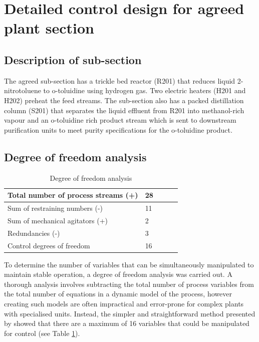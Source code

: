\section{Detailed control design for agreed plant section}
\label{sec:subsec}

\subsection{Description of sub-section}
The agreed sub-section has a trickle bed reactor (R201) that reduces liquid 2-nitrotoluene to o-toluidine using hydrogen gas. Two electric heaters (H201 and H202) preheat the feed streams. The sub-section also has a packed distillation column (S201) that separates the liquid effluent from R201 into methanol-rich vapour and an o-toluidine rich product stream which is sent to downstream purification units to meet purity specifications for the o-toluidine product.

\subsection{Degree of freedom analysis}

\begin{table}
\centering
    \caption{Degree of freedom analysis}
    \label{tab:dof}
\begin{tabular}{@{}lllll@{}}
\toprule
Total number of process streams (+) & 28 &  &  &  \\ \midrule
Sum of restraining numbers (-)      & 11 &  &  &  \\
Sum of mechanical agitators (+)     & 2  &  &  &  \\
Redundancies (-)                    & 3  &  &  &  \\
Control degrees of freedom          & 16 &  &  &  \\ \bottomrule
\end{tabular}
\end{table}

To determine the number of variables that can be simultaneously manipulated to maintain stable operation, a degree of freedom analysis was carried out. A thorough analysis involves subtracting the total number of process variables from the total number of equations in a dynamic model of the process, however creating such models are often impractical and error-prone for complex plants with specialised units. Instead, the simpler and straightforward method presented by \textcite{} showed that there are a maximum of 16 variables that could be manipulated for control (see Table \ref{tab:dof}).

